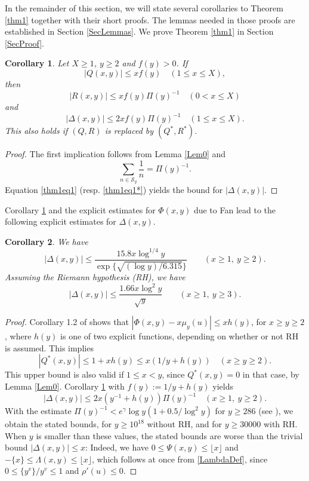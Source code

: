 \documentclass[11pt]{amsart}
\newtheorem{corollary}{Corollary}
\begin{document}
In the remainder of this section, we will state several corollaries to Theorem \ref{thm1} together with their short proofs.
The lemmas needed in those proofs are established in Section \ref{SecLemmas}.
We prove Theorem \ref{thm1} in Section \ref{SecProof}.

\begin{corollary}\label{corexact}
Let $X\ge 1$, $y\ge 2$ and $f(y)>0$. If 
$$
|Q(x,y)| \le x f(y) \quad (1\le x \le  X) ,
$$
then
$$
|R(x,y)| \le x f(y) \Pi(y)^{-1} \quad (0 < x \le X) 
$$
and 
$$
|\Delta(x,y)| \le 2 x f(y) \Pi(y)^{-1} \quad (1\le  x \le  X).
$$
This also holds if $(Q,R)$ is replaced by $(Q^*,R^*)$. 
\end{corollary}
\begin{proof}
The first implication follows from Lemma \ref{Lem0} and
\begin{equation}\label{Sum1}
 \sum_{n \in \mathcal{S}_y} \frac{1}{n}= \Pi(y)^{-1} .
\end{equation}
Equation \eqref{thm1eq1} (resp.  \eqref{thm1eq1*}) yields the bound for $|\Delta(x,y)| $.
\end{proof}

Corollary \ref{corexact} and the explicit estimates for $\Phi(x,y)$ due to Fan \cite{Fan} lead to the following explicit estimates for $\Delta(x,y)$.
\begin{corollary}\label{corFan}
We have
$$
|\Delta(x,y)| \le  \frac{15.8 x \log^{1/4} y}{\exp\{\sqrt{(\log y)/6.315}\} }  \qquad (x\ge 1, \ y\ge 2).
$$
Assuming the Riemann hypothesis (RH), we have
$$
|\Delta(x,y)| \le   \frac{1.66 x\log^2 y}{\sqrt{y}} \qquad (x\ge 1,\  y\ge 3).
$$
\end{corollary}
\begin{proof}
Corollary 1.2 of \cite{Fan} shows that $|\Phi(x,y)-x \mu_y(u)| \le x h(y)$, for $x\ge y \ge 2$,
where $h(y)$ is one of two explicit functions, depending on whether or not RH is assumed. 
This implies
$$|Q^*(x,y)|\le 1 + x h(y)  \le x(1/y + h(y) ) \quad (x\ge y\ge 2). $$ 
This upper bound is also valid if $1\le x<y$, since $Q^*(x,y) = 0$ in that case, by Lemma \ref{Lem0}.
Corollary \ref{corexact} 
with $f(y):= 1/y + h(y)$ yields
$$
|\Delta(x,y)| \le  2x(y^{-1} + h(y)) \Pi(y)^{-1} \quad (x\ge 1,\ y\ge 2).
$$
With the estimate $\Pi(y)^{-1}<e^\gamma \log y (1 + 0.5/\log^2 y)$ for $y\ge 286$ (see \cite[Thm 8]{RS}),
we obtain the stated bounds, for $y\ge 10^{18}$ without RH, and for $y\ge 30000$ with RH.
When $y$ is smaller than these values, the stated bounds are worse than the trivial bound $|\Delta(x,y)|\le x$:  Indeed, we have  
$0\le \Psi(x,y) \le \lfloor x \rfloor $ and $-\{x\} \le \Lambda(x,y) \le \lfloor x \rfloor $, which
follows at once from \eqref{LambdaDef}, since $0\le \{y^v\}/y^v \le 1$ and $\rho'(u)\le 0$.
\end{proof}
\end{document}
